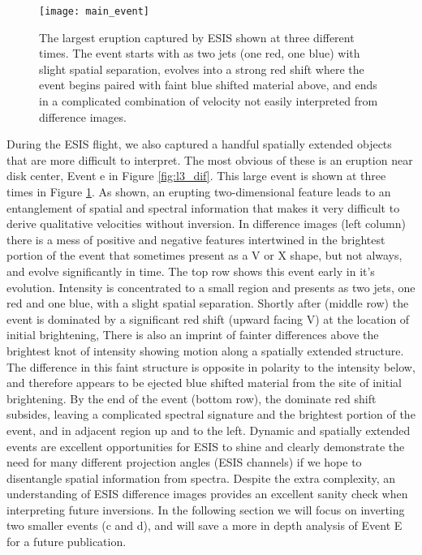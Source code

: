     	
    	\begin{figure}[htb!]
    		\texttt{[image: main\_event]}
    		\centering
    		\caption{ The largest eruption captured by ESIS shown at three different times. The event starts with as two jets (one red, one blue) with slight spatial separation, evolves into a strong red shift where the event begins paired with faint blue shifted material above, and ends in a complicated combination of velocity not easily interpreted from difference images. }
    		\label{fig:main_event}
    	\end{figure}
		
    	During the ESIS flight, we also captured a handful spatially extended objects that are more difficult to interpret.
    	The most obvious of these is an eruption near disk center, Event e in Figure \ref{fig:l3_dif}.
    	This large event is shown at three times in Figure \ref{fig:main_event}.
    	As shown, an erupting two-dimensional feature leads to an entanglement of spatial and spectral information that makes it very difficult to derive qualitative velocities without inversion.
    	In difference images (left column) there is a mess of positive and negative features intertwined in the brightest portion of the event that sometimes present as a V or X shape, but not always, and evolve significantly in time.
    	The top row shows this event early in it's evolution. 
    	Intensity is concentrated to a small region and presents as two jets, one red and one blue, with a slight spatial separation.
    	Shortly after (middle row) the event is dominated by a significant red shift (upward facing V) at the location of initial brightening, 
    	There is also an imprint of fainter differences above the brightest knot of intensity showing motion along a spatially extended structure.
    	The difference in this faint structure is opposite in polarity to the intensity below, and therefore appears to be ejected blue shifted material from the site of initial brightening.
    	By the end of the event (bottom row), the dominate red shift subsides, leaving a complicated spectral signature and the brightest portion of the event, and in adjacent region up and to the left.  
    	Dynamic and spatially extended events are excellent opportunities for ESIS to shine and clearly demonstrate the need for many different projection angles (ESIS channels) if we hope to disentangle spatial information from spectra.
    	Despite the extra complexity, an understanding of ESIS difference images provides an excellent sanity check when interpreting future inversions.
    	In the following section we will focus on inverting two smaller events (c and d), and will save a more in depth analysis of Event E for a future publication. 
    	
